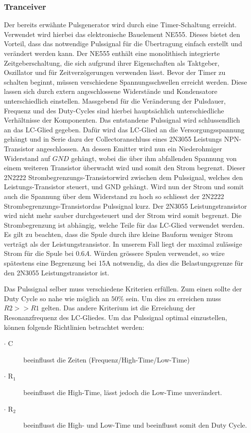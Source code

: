 \subsubsection*{Tranceiver}
Der bereits erwähnte Pulsgenerator wird durch eine Timer-Schaltung erreicht. Verwendet wird hierbei das elektronische Bauelement NE555. Dieses bietet den Vorteil, dass das notwendige Pulssignal für die Übertragung einfach erstellt und verändert werden kann. Der NE555 enthält eine monolithisch integrierte Zeitgeberschaltung, die sich aufgrund ihrer Eigenschaften als Taktgeber, Oszillator und für Zeitverzögerungen verwenden lässt. Bevor der Timer zu schalten beginnt, müssen verschiedene Spannungsschwellen erreicht werden. Diese lassen sich durch extern angeschlossene Widerstände und Kondensatore unterschiedlich einstellen. Massgebend für die Veränderung der Pulsdauer, Frequenz und des Duty-Cycles sind hierbei hauptsächlich unterschiedliche Verhältnisse der Komponenten. Das entstandene Pulssignal wird schlussendlich an das LC-Glied gegeben. Dafür wird das LC-Glied an die Versorgungsspannung gehängt und in Serie dazu der Collectoranschluss eines 2N3055 Leistungs NPN-Transistor angeschlossen. An dessen Emitter wird nun ein Niederohmiger Widerstand auf $GND$ gehängt, wobei die über ihm abfallenden Spannung von einem weiteren Transistor überwacht wird und somit den Strom begrenzt. Dieser \glqq 2N2222 Strombegrenzungs-Transistor\grqq wird zwischen dem Pulssignal, welches den Leistungs-Transistor steuert, und GND gehängt. Wird nun der Strom und somit auch die Spannung über dem Widerstand zu hoch so schliesst der \glqq 2N2222 Strombegrenzungs-Transistor\grqq das Pulssignal kurz. Der 2N3055 Leistungstransistor wird nicht mehr sauber durchgesteuert und der Strom wird somit begrenzt. Die Strombegrenzung ist abhängig, welche Teile für das LC-Glied verwendet werden. Es gilt zu beachten, dass die Spule durch ihre kleine Bauform weniger Strom verträgt als der Leistungstransistor. In unserem Fall liegt der maximal zulässige Strom für die Spule bei $0.6A$. Würden grössere Spulen verwendet, so wäre spätestens eine Begrenzung bei 15A notwendig, da dies die Belastungsgrenze für den 2N3055 Leistungstransistor ist.
 
Das Pulssignal selber muss verschiedene Kriterien erfüllen. Zum einen sollte der Duty Cycle so nahe wie möglich an $50\%$ sein. Um dies zu erreichen muss $R2 >> R1$ gelten. Das andere Kriterium ist die Erreichung der Resonanzfrequenz des LC-Gliedes. Um das Pulssignal optimal einzustellen, können folgende Richtlinien betrachtet werden:
\begin{description}
	\item [$\cdot$ C] beeinflusst die Zeiten (Frequenz/High-Time/Low-Time)
	\item [$\cdot$ R$_{1}$] beeinflusst die High-Time, lässt jedoch die Low-Time unverändert.
	\item [$\cdot$ R$_{2}$ ] beeinflusst die High- und Low-Time und beeinflusst somit den Duty Cycle.
\end{description}

